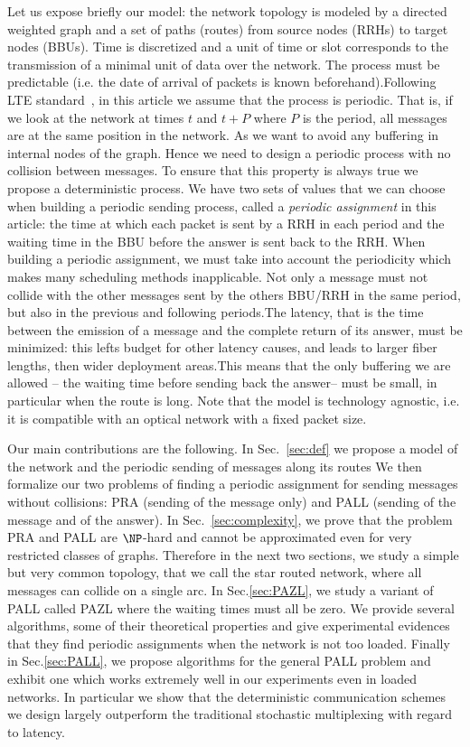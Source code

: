 \documentclass[10pt, conference, letterpaper]{IEEEtran}
\begin{document}
Let us expose briefly our model: the network topology is modeled by a directed weighted graph and a set of paths (routes) from source nodes (RRHs) to target nodes (BBUs). Time is discretized and a unit of time or slot corresponds to the transmission of a minimal unit of data over the network. The process must be  predictable (i.e. the date of arrival of packets is known beforehand).Following LTE standard~\cite{bouguen2012lte}, in this article we assume that the process is periodic. That is, if we look at the network at times $t$ and $t+P$ where $P$ is the period, all messages are at the same position in the network. As we want to avoid any  buffering in internal nodes of the graph. Hence we need to design a periodic process with no collision between messages. To ensure that this property is always true we propose a deterministic process.  We have two sets of values that we can choose when building a periodic sending process, called a \emph{periodic assignment} in this article: the time at which each packet is sent by a RRH in each period and the waiting time in the BBU before the answer is sent back to the RRH. When building a periodic assignment, we must take into account the periodicity which makes many scheduling methods inapplicable. Not only a message must not collide with the other messages sent by the others BBU/RRH in the same period, but also in the previous and following periods.The latency, that is the time between the emission of a message and the complete return of its answer, must be minimized: this lefts budget for other latency causes, and leads to larger fiber lengths, then wider deployment areas.This means that the only buffering we are allowed -- the waiting time before sending back the answer-- must be small, in particular when the route is long. Note that the
model is technology agnostic, i.e. it is compatible with an optical network with a fixed packet size.   

Our main contributions are the following.
 In Sec.~\ref{sec:def} we propose a model of the network and the periodic sending of messages along its routes
 We then formalize our two problems of finding a periodic assignment for sending messages without collisions: PRA (sending of the message only) and PALL (sending of the message and of the answer).  
In Sec.~\ref{sec:complexity}, we prove that the problem PRA and PALL are $\NP$-hard and cannot be approximated even for very
restricted classes of graphs. 
Therefore in the next two sections, we study a simple but very common topology, that we call the
star routed network, where all messages can collide on a single arc.
In Sec.\ref{sec:PAZL}, we study a variant of PALL called PAZL  where the waiting times must all be zero. We provide several algorithms, some of their theoretical properties and give experimental evidences that they find periodic assignments when the network is not too loaded. Finally in Sec.\ref{sec:PALL}, we propose algorithms for the general PALL problem and exhibit one which works extremely well in our experiments even in loaded networks. In particular we show that the deterministic communication schemes we design largely outperform the traditional stochastic multiplexing with regard to latency. 
\end{document}
